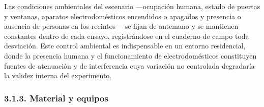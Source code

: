 \documentclass[
  12pt,
]{article}
\begin{document}
Las condiciones ambientales del escenario —ocupación humana, estado de
puertas y ventanas, aparatos electrodomésticos encendidos o apagados y
presencia o ausencia de personas en los recintos— se fijan de antemano y
se mantienen constantes dentro de cada ensayo, registrándose en el
cuaderno de campo toda desviación. Este control ambiental es
indispensable en un entorno residencial, donde la presencia humana y el
funcionamiento de electrodomésticos constituyen fuentes de atenuación y
de interferencia cuya variación no controlada degradaría la validez
interna del experimento.

\subsubsection{3.1.3. Material y equipos}\label{material-y-equipos}
\end{document}
